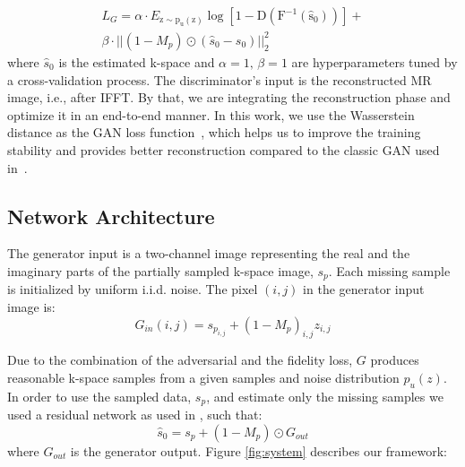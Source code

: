 \documentclass[review]{elsarticle}
\begin{document}
\begin{equation}
\begin{aligned}L_{G}=\alpha\cdot E_{\mathrm{z\sim p_{u}\left(z\right)}}\mathrm{\log\left[1-D\left(F^{-1}\left(\hat{s}_{0}\right)\right)\right]}+\\
\beta\cdot||\left(1-M_{p}\right)\odot\left(\hat{s}_{0}-s_{0}\right)||_{2}^{2}
\end{aligned}
\end{equation}
where $\hat{s}_{0}$ is the estimated k-space and $\alpha=1,\,\beta=1$ are hyperparameters tuned by a cross-validation process. The discriminator's input is the reconstructed MR image,\textbf{ }i.e.,\textbf{ }after IFFT. By that, we are integrating the reconstruction phase and optimize it in an end-to-end manner.
In this work, we use the Wasserstein distance as the GAN loss function~\cite{arjovsky2017wasserstein}, which helps us to improve the training stability and provides better reconstruction compared to the classic GAN used in~\cite{shitrit2017accelerated}.

\subsection{Network Architecture}

The generator input is a two-channel image representing the real and the imaginary parts of the partially sampled k-space image, $s_{p}$. Each missing sample is initialized by uniform i.i.d. noise. The pixel $\left(i,j\right)$ in the generator input image is: 
\begin{equation}
G_{in}\left(i,j\right)=s_{p_{i,j}}+\left(1-M_{p}\right)_{i,j}z_{i,j}
\end{equation}

Due to the combination of the adversarial and the fidelity loss, $G$ produces reasonable k-space samples from a given samples and noise distribution $p_{u}\left(z\right)$. In order to use the sampled data, $s_{p}$, and estimate only the missing samples we used a residual network \cite{he2016deep} as used in \cite{Oktay2016}, such that:
\begin{equation}
\hat{s}_{0}=s_{p}+\left(1-M_{p}\right)\odot G_{out}
\end{equation}
where $G_{out}$ is the generator output. Figure \ref{fig:system} describes our framework:

\end{document}
